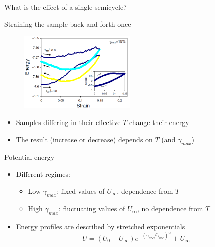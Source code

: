 \documentclass[compress]{beamer}
\begin{document}
	\begin{frame}{What is the effect of a single semicycle? }
		
		\begin{block}{Straining the sample back and forth once}

			\begin{figure}
				\includegraphics[width=0.5\textwidth]{Graphics/Literature/Rejuvenaging}
			\end{figure}
			
			\vspace{-0.2cm}
			
			\begin{itemize}
					\item<2-> Samples differing in their effective $T$ change their energy
					\item<3-> The result (increase or decrease) depends on $T$ (and $\gamma_{max}$)  
			\end{itemize}
			
		\end{block}
		
	\end{frame}


	\begin{frame}{Potential energy}

		\begin{figure}
		\end{figure}
		
		\begin{itemize}
			\item<1-> Different regimes:
				\begin{itemize}
					\item<1-> Low $\gamma_{max}$: fixed values of $U_{\infty}$, dependence from $T$
					\item<2-> High $\gamma_{max}$: fluctuating values of $U_{\infty}$, no dependence from $T$
				\end{itemize}
			\item<4-> Energy profiles are described by stretched exponentials $$U = ( U_{0} - U_{\infty}) e^{-(\gamma_{acc}/\widetilde \gamma_{acc})^\alpha} + U_{\infty}$$
		\end{itemize}
		
	\end{frame}	
\end{document}
